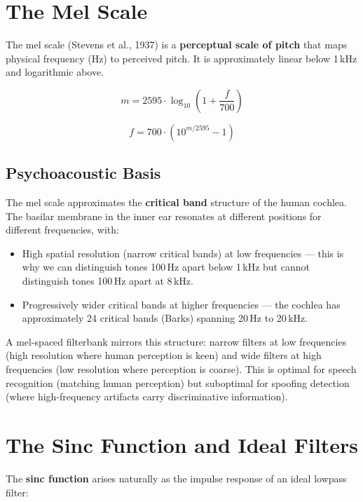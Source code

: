 \documentclass[12pt]{report}
\begin{document}
\section{The Mel Scale}

The mel scale (Stevens et al., 1937) is a \textbf{perceptual scale of pitch} that maps
physical frequency (Hz) to perceived pitch. It is approximately linear below 1\,kHz and
logarithmic above.

\begin{equation}
    m = 2595 \cdot \log_{10}\!\left(1 + \frac{f}{700}\right)
\end{equation}

\begin{equation}
    f = 700 \cdot \left(10^{m/2595} - 1\right)
\end{equation}

\subsection{Psychoacoustic Basis}

The mel scale approximates the \textbf{critical band} structure of the human cochlea.
The basilar membrane in the inner ear resonates at different positions for different
frequencies, with:
\begin{itemize}[noitemsep]
    \item High spatial resolution (narrow critical bands) at low frequencies --- this is why
          we can distinguish tones 100\,Hz apart below 1\,kHz but cannot distinguish tones
          100\,Hz apart at 8\,kHz.
    \item Progressively wider critical bands at higher frequencies --- the cochlea has
          approximately 24 critical bands (Barks) spanning 20\,Hz to 20\,kHz.
\end{itemize}

A mel-spaced filterbank mirrors this structure: narrow filters at low frequencies (high
resolution where human perception is keen) and wide filters at high frequencies (low
resolution where perception is coarse). This is optimal for speech recognition (matching
human perception) but suboptimal for spoofing detection (where high-frequency artifacts
carry discriminative information).


\section{The Sinc Function and Ideal Filters}

The \textbf{sinc function} arises naturally as the impulse response of an ideal lowpass filter:
\end{document}
